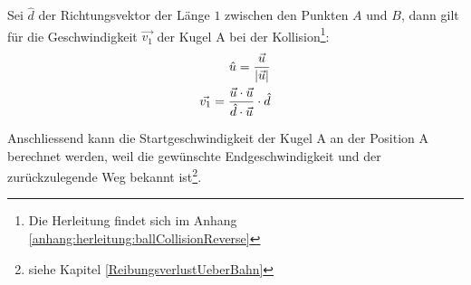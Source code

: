 Sei $\hat{d}$ der Richtungsvektor der Länge $1$ zwischen den Punkten $A$ und $B$,
dann gilt für die Geschwindigkeit $\vec{v_1}$ der Kugel A bei der Kollision\footnote{Die Herleitung findet sich im Anhang \ref{anhang:herleitung:ballCollisionReverse}}:
\begin{align}
    \hat{u} = \frac{\vec{u}}{\lvert \vec{u} \rvert}\\
    \vec{v_1} = \frac{\vec{u} \cdot \vec{u}}{\hat{d} \cdot \vec{u}} \cdot \hat{d}\\
\end{align}

Anschliessend kann die Startgeschwindigkeit der Kugel A an der Position A berechnet werden, weil die gewünschte
Endgeschwindigkeit und der zurückzulegende Weg bekannt ist\footnote{siehe Kapitel \ref{ReibungsverlustUeberBahn}}.
